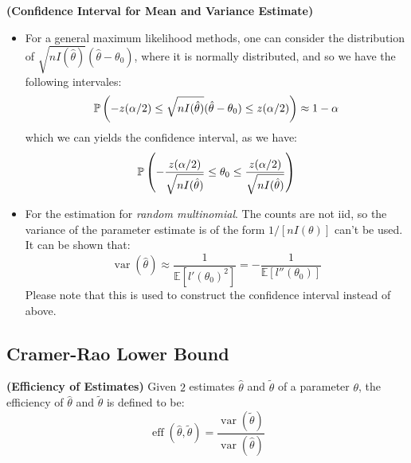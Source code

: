 \begin{remark}{\textbf{(Confidence Interval for Mean and Variance Estimate)}}
\begin{itemize}
\begin{equation*}
            \mathbb{P}\bracka{\frac{n\hat{\sigma}^2}{\chi^2_{n-1}(\alpha/2)} \le \sigma^2 \le \frac{n\hat{\sigma}^2}{\chi^2(1-\alpha/2)}} = 1-\alpha
        \end{equation*}
        \item For a general maximum likelihood methods, one can consider the distribution of $\sqrt{nI(\hat{\theta})}(\hat{\theta} - \theta_0)$, where it is normally distributed, and so we have the following intervales:
        \begin{equation*}
            \mathbb{P}\left( -z(\alpha/2) \le \sqrt{nI(\hat{\theta})}(\hat{\theta}-\theta_0) \le z(\alpha/2)  \right) \approx 1-\alpha
        \end{equation*}
        which we can yields the confidence interval, as we have:
        \begin{equation*}
            \mathbb{P}\left(  -\frac{z(\alpha/2)}{\sqrt{nI(\hat{\theta})}} \le \theta_0 \le \frac{z(\alpha/2)}{\sqrt{nI(\hat{\theta})}}   \right) 
        \end{equation*}
        \item For the estimation for \emph{random multinomial}. The counts are not iid, so the variance of the parameter estimate is of the form $1/[nI(\theta)]$ can't be used. It can be shown that:
        \begin{equation*}
            \operatorname{var}(\hat{\theta}) \approx \frac{1}{\mathbb{E}[l'(\theta_0)^2]} = -\frac{1}{\mathbb{E}[l''(\theta_0)]}
        \end{equation*}
        Please note that this is used to construct the confidence interval instead of above. 
    \end{itemize}
\end{remark}

\subsection{Cramer-Rao Lower Bound}

 \begin{definition}{\textbf{(Efficiency of Estimates)}}
    Given $2$ estimates $\hat{\theta}$ and $\tilde{\theta}$ of a parameter $\theta$, the efficiency of $\hat{\theta}$ and $\tilde{\theta}$ is defined to be:
    \begin{equation*}
        \operatorname{eff}(\hat{\theta}, \tilde{\theta}) = \frac{\operatorname{var}(\tilde{\theta})}{\operatorname{var}(\hat{\theta})}
    \end{equation*}
 \end{definition}

